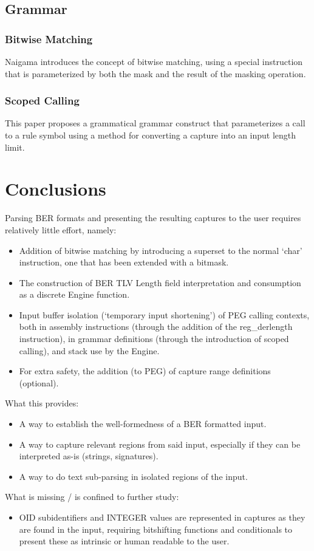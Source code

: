 \subsection{Grammar}

\subsubsection{Bitwise Matching}

Naigama introduces the concept of bitwise matching, using a special 
instruction that is parameterized by both the mask and the result of the 
masking operation.

\subsubsection{Scoped Calling}

This paper proposes a grammatical grammar construct that parameterizes a 
call to a rule symbol using a method for converting a capture into an 
input length limit.

\newpage
\section{Conclusions}

Parsing BER formats and presenting the resulting captures to the user 
requires relatively little effort, namely:

\begin{itemize}
    \item Addition of bitwise matching by introducing a superset to the 
normal ‘char’ instruction, one that has been extended with a bitmask.
    \item The construction of BER TLV Length field interpretation and 
consumption as a discrete Engine function.
    \item Input buffer isolation (‘temporary input shortening’) of PEG 
calling contexts, both in assembly instructions (through the addition of 
the reg\_derlength instruction), in grammar definitions (through the 
introduction of scoped calling), and stack use by the Engine.
    \item For extra safety, the addition (to PEG) of capture range 
definitions (optional).
\end{itemize}
What this provides:
\begin{itemize}
    \item A way to establish the well-formedness of a BER formatted input.
    \item A way to capture relevant regions from said input, especially if 
they can be interpreted as-is (strings, signatures).
    \item A way to do text sub-parsing in isolated regions of the input.
\end{itemize}
What is missing / is confined to further study:
\begin{itemize}
    \item OID subidentifiers and INTEGER values are represented in captures 
as they are found in the input, requiring bitshifting functions and 
conditionals to present these as intrinsic or human readable to the user.
\end{itemize}

